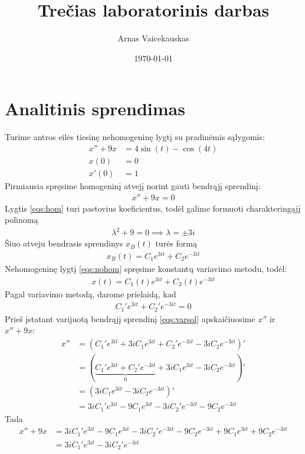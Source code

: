 \documentclass[11pt]{article}
\title{ Trečias laboratorinis darbas}
\author{ Arnas Vaicekauskas }
\date{\today}
\begin{document}
\maketitle

\section{Analitinis sprendimas}
Turime antros eilės tiesinę nehomogeninę lygtį su pradinėmis sąlygomis:
\begin{align}
x''+9x&=4\sin(t)-\cos(4t) \label{eqs:nohom}\\
x(0)&=0\label{eqs:initial-1}\\
x'(0)&=1\label{eqs:initial-2}
\end{align}
Pirmiausia spręsime homogeninį atvejį norint gauti bendrąjį sprendinį:
\begin{align}
    x''+9x=0 \label{eqs:hom}
\end{align}
Lygtis \eqref{eqs:hom} turi pastovius koeficientus, 
todėl galime formuoti charakteringąjį polinomą
\begin{align*}
    \lambda^2+9=0\implies\lambda=\pm3i
\end{align*}
Šiuo atveju bendrasis sprendinys $x_B(t)$ turės formą 
\begin{align}
x_B(t)=C_1e^{3it}+C_2e^{-3it}
\end{align}
Nehomogeninę lygtį \eqref{eqs:nohom} spręsime
konstantų variavimo metodu, todėl:
\begin{align}
x(t)=C_1(t)e^{3it}+C_2(t)e^{-3it} \label{eqs:varsol}
\end{align}
Pagal variavimo metodą, darome prielaidą, kad 
\begin{align}
C_1'e^{3it}+C_2'e^{-3it}=0  \label{eqs:assumtion}
\end{align}
Prieš įstatant varijuotą bendrąjį sprendinį \eqref{eqs:varsol} apskaičiuosime $x''$ ir $x''+9x$: 
\begin{align*}
x''&=(C_1'e^{3it}+3iC_1e^{3it}+C_2'e^{-3it}-3iC_2e^{-3it})'\\
&=(\underbrace{C_1'e^{3it}+C_2'e^{-3it}}_0+3iC_1e^{3it}-3iC_2e^{-3it})'\\
&=(3iC_1e^{3it}-3iC_2e^{-3it})'\\
&=3iC_1'e^{3it}-9C_1e^{3it}-3iC_2'e^{-3it}-9C_2e^{-3it}
\end{align*}
Tada
\begin{align*}
x''+9x&=3iC_1'e^{3it}-9C_1e^{3it}-3iC_2'e^{-3it}-9C_2e^{-3it}+9C_1e^{3it}+9C_2e^{-3it}\\
&=3iC_1'e^{3it}-3iC_2'e^{-3it}
\end{align*}
\end{document}
